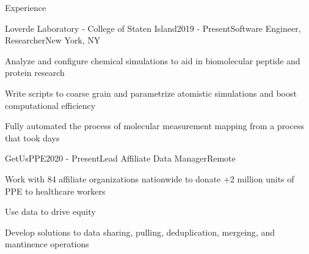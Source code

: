 \documentclass{resume}
\begin{document}
\begin{rSection}{Experience}
    \begin{rSubsection}{Loverde Laboratory - College of Staten Island}{2019 - Present}{Software Engineer, Researcher}{New York, NY}
        \item Analyze and configure chemical simulations to aid in biomolecular peptide and protein research
        \item Write scripts to coarse grain and parametrize atomistic simulations and boost computational efficiency
        \item Fully automated the process of molecular measurement mapping from a process that took days 
    \end{rSubsection}

    \begin{rSubsection}{GetUsPPE}{2020 - Present}{Lead Affiliate Data Manager}{Remote}
        \item Work with 84 affiliate organizations nationwide to donate +2 million units of PPE to healthcare workers
        \item Use data to drive equity
       \item Develop solutions to data sharing, pulling, deduplication, mergeing, and mantinence operations
    \end{rSubsection}



\end{rSection}
\end{document}
